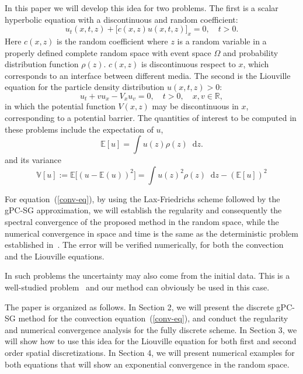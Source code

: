 \documentclass[12pt]{article}
\theoremstyle{plain}
\theoremstyle{remark}
\theoremstyle{remark}
\theoremstyle{remark}
\numberwithin{equation}{section}
\newcommand*\diff{\mathop{}\!\mathrm{d}}
\newcommand{\R}{{\mathbb{R}}}
\begin{document}
In this paper we will develop this idea for two problems. The first
is a scalar hyperbolic equation with a discontinuous and random coefficient:
\begin{equation}
\label{conv-eq}
  u_t(x, t, z) + \big[c(x,z)u(x,t,z)\big]_x = 0, \quad t > 0.
\end{equation}
Here $c(x,z)$ is the random coefficient where $z$ is a random variable in a properly defined complete random space with event space $\Omega$ and probability distribution function $\rho(z)$. $c(x,z)$ is discontinuous respect to $x$, which corresponds to an interface between different media. The second is the Liouville equation for the particle density distribution $u(x,t,z)>0$:
\begin{equation}\label{eq_Liou}
  u_t + v  u_x - V_x  u_v = 0, \quad t>0, \quad x, v \in \R,
\end{equation}
in which the potential function $V(x,z)$ may be discontinuous in $x$, corresponding to a potential barrier. 
The quantities of interest to be computed in these problems include the expectation of $u$,
\begin{equation}\label{exp}
  \mathbb{E}[u] = \int u(z) \rho(z)\diff z.
\end{equation}
and its variance
\begin{equation}\label{var}
  \mathbb{V}[u]:=\mathbb{E}\big[(u-\mathbb{E}(u))^2\big] = \int u(z)^2  \rho(z) \diff z - (\mathbb{E}[u])^2
\end{equation}

For equation~(\ref{conv-eq}), by using the Lax-Friedrichs scheme followed
by the gPC-SG approximation,  we will establish the regularity and consequently the spectral convergence of the proposed method in
the random space, while the numerical convergence in space and time is the
same as the deterministic problem established in~\cite{Qi:2013byba}.
The error will be verified numerically, for both the convection and the Liouville equations. 

In such problems the uncertainty may also come from the initial data. This is
a well-studied problem~\cite{GX, Tang:2012ibba} and our method can obviously be used in this case.

The paper is organized as follows. In Section 2, we will present the
discrete gPC-SG method for  the convection equation~(\ref{conv-eq}),
and conduct the regularity and numerical convergence analysis for the fully
discrete scheme.  In Section 3, we will show how to use this idea for the Liouville equation for both first  and  second order spatial discretizations.
 In Section 4, we will present numerical examples for both equations that will show an exponential convergence in the random space. 
\end{document}
